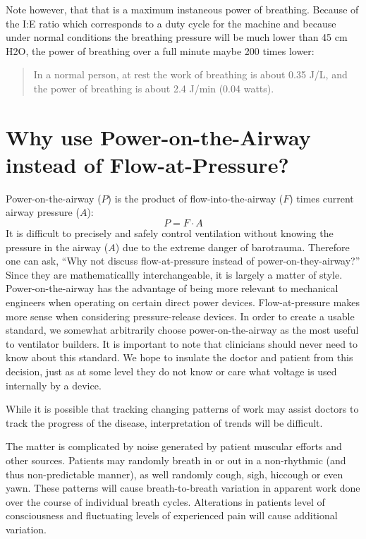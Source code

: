 \documentclass[conference]{article}
\begin{document}
Note however, that that is a maximum instaneous power of breathing. Because of the I:E ratio which corresponds to a duty cycle for the machine
and because under normal
conditions the breathing pressure will be much lower than 45 cm H2O, the power of breathing over a full minute
maybe 200 times lower:
\begin{quote}
In a normal person, at rest the work of breathing is about 0.35 J/L, and the power of breathing is about 2.4 J/min (0.04 watts)\cite{mancebo1995comparative}.
\end{quote}

\section{Why use Power-on-the-Airway instead of Flow-at-Pressure?}

Power-on-the-airway ($P$) is the product of flow-into-the-airway ($F$) times
current airway pressure ($A$):
\begin{equation}
  P = F \cdot A
\end{equation}
It is difficult to precisely and safely control ventilation without knowing the
pressure in the airway ($A$) due to the extreme danger of barotrauma.
Therefore one can ask,
``Why not discuss flow-at-pressure instead
of power-on-they-airway?''
Since they are mathematicallly interchangeable, it is
largely a matter of style. Power-on-the-airway has the advantage of being
more relevant to mechanical engineers when operating on certain direct power devices.
Flow-at-pressure makes more sense when considering pressure-release devices.
In order to create a usable standard, we somewhat arbitrarily choose power-on-the-airway
as the most useful to ventilator builders. It is important to note that clinicians
should never need to know about this standard. We hope to insulate the doctor and
patient from this decision, just as at some level they do not know or care what voltage
is used internally by a device.

While it is possible that tracking changing patterns of work may assist doctors to track the progress of the disease, interpretation of trends will be difficult.

The matter is complicated by noise generated by patient muscular efforts and other sources.
Patients may randomly breath in or out in a non-rhythmic (and thus non-predictable manner),
as well randomly cough, sigh, hiccough or even yawn. These patterns will cause breath-to-breath
variation in apparent work done over the course of individual breath cycles.
Alterations in patients level of consciousness and fluctuating levels of experienced pain will cause additional variation.
\end{document}
